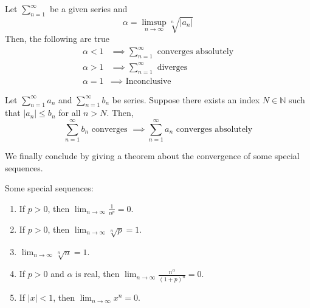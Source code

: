   \begin{theorem}
    Let $\sum_{n=1}^\infty$ be a given series and 
    \begin{equation}
      \alpha = \limsup_{n\rightarrow \infty} \sqrt[n]{|a_n|}
    \end{equation}
    Then, the following are true
    \begin{align*}
      \alpha < 1 & \implies \sum_{n=1}^\infty \text{ converges absolutely} \\
      \alpha > 1 & \implies \sum_{n=1}^\infty \text{ diverges} \\
      \alpha = 1 & \implies \text{ Inconclusive} 
    \end{align*}
  \end{theorem}

  \begin{theorem}
    Let $\sum_{n=1}^\infty a_n$ and $\sum_{n=1}^\infty b_n$ be series. Suppose there exists an index $N \in \mathbb{N}$ such that $|a_n| \leq b_n$ for all $n>N$. Then, 
    \begin{equation}
      \sum_{n=1}^\infty b_n \text{ converges } \implies \sum_{n=1}^\infty a_n \text{ converges absolutely}
    \end{equation}
  \end{theorem}

  We finally conclude by giving a theorem about the convergence of some special sequences. 

  \begin{theorem}
    Some special sequences: 
    \begin{enumerate}
      \item If $p > 0$, then $\lim_{n \rightarrow \infty} \frac{1}{n^p} = 0$. 
      
      \item If $p > 0$, then $\lim_{n \rightarrow \infty} \sqrt[n]{p} = 1$. 

      \item $\lim_{n \rightarrow \infty} \sqrt[n]{n} = 1$. 

      \item If $p > 0$ and $\alpha$ is real, then $\lim_{n \rightarrow \infty} \frac{n^\alpha}{(1 + p)^n} = 0$. 
      
      \item If $|x| < 1$, then $\lim_{n \rightarrow \infty} x^n = 0$. 
    \end{enumerate}
  \end{theorem}

